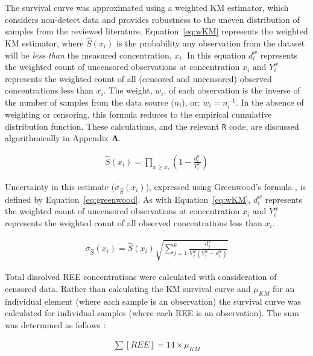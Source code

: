 The survival curve was approximated using a weighted KM estimator, which considers non-detect data and provides robustness to the uneven distribution of samples from the reviewed literature.
Equation~\ref{eq:wKM} represents the weighted KM estimator, where $\hat{S}(x_i)$ is the probability any observation from the dataset will be \textit{less than} the measured concentration, $x_i$.
In this equation $d_i^w$ represents the weighted count of uncensored observations at concentration $x_i$ and $Y_i^w$ represents the weighted count of all (censored and uncensored) observed concentrations less than $x_i$.
The weight, $w_i$, of each observation is the inverse of the number of samples from the data source ($n_i$), or: $w_i = n_i^{-1}$.
In the absence of weighting or censoring, this formula reduces to the empirical cumulative distribution function.
These calculations, and the relevant \texttt{R} code, are discussed algorithmically in Appendix \textbf{A}.

\begin{align}\label{eq:wKM}
\hat{S}(x_i) = \prod_{x \geq x_i}\left(1 - \frac{d_i^w}{Y_i^w} \right)
\end{align}

Uncertainty in this estimate ($\sigma_{\hat{S}}(x_i)$), expressed using Greenwood's formula \citep{Helsel_book}, is defined by Equation~\ref{eq:greenwood}. As with Equation~\ref{eq:wKM}, $d_i^w$ represents the weighted count of uncensored observations at concentration $x_i$ and $Y_i^w$ represents the weighted count of all observed concentrations less than $x_i$.

\begin{align}\label{eq:greenwood}
\sigma_{\hat{S}}(x_i) = \hat{S}(x_i)\sqrt{\sum_{j=1}^k\frac{d_j^w}{Y_j^w (Y_j^w - d_j^w)}}
\end{align}

Total dissolved REE concentrations were calculated with consideration of censored data.
Rather than calculating the KM survival curve and $\mu_{KM}$ for an individual element (where each sample is an observation) the survival curve was calculated for individual samples (where each REE is an observation).
The sum was determined as follows \citep{Helsel_book}:

\begin{align}\label{eq:totalREE}
\sum [REE] = 14\times \mu_{KM}
\end{align}

